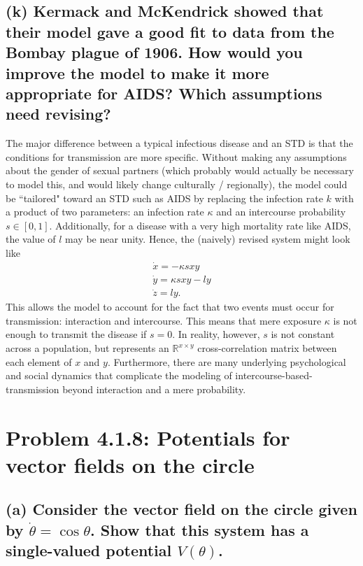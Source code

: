 \documentclass[draft]{agujournal2019}
\begin{document}
\subsection{(k) Kermack and McKendrick showed that their model gave a good fit to data from the Bombay plague of 1906. How would you improve the model to make it more appropriate for AIDS? Which assumptions need revising? }
\label{ssec:p2k}
The major difference between a typical infectious disease and an STD is that the conditions for transmission are more specific. Without making any assumptions about the gender of sexual partners (which probably would actually be necessary to model this, and would likely change culturally / regionally), the model could be ``tailored" toward an STD such as AIDS by replacing the infection rate $k$ with a product of two parameters: an infection rate $\kappa$ and an intercourse probability $s\in[0,1]$. Additionally, for a disease with a very high mortality rate like AIDS, the value of $l$ may be near unity. Hence, the (naively) revised system might look like 
\begin{align*}
    \dot x = -\kappa s xy \\ 
    \dot y = \kappa s xy - ly\\
    \dot z = ly.
\end{align*}
This allows the model to account for the fact that two events must occur for transmission: interaction and intercourse. This means that mere exposure $\kappa$ is not enough to transmit the disease if $s=0$. In reality, however, $s$ is not constant across a population, but represents an $\mathbb{R}^{x\times y}$ cross-correlation matrix between each element of $x$ and $y$. Furthermore, there are many underlying psychological and social dynamics that complicate the modeling of intercourse-based-transmission beyond interaction and a mere probability. 



\section{Problem 4.1.8: Potentials for vector fields on the circle}
\label{sec:p3}


\subsection{(a) Consider the vector field on the circle given by $\dot \theta=\cos{\theta}$. Show that this system has a single-valued potential $V(\theta)$. }
\label{ssec:p3a}
\end{document}
